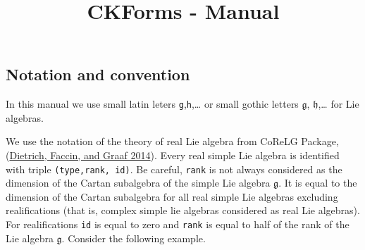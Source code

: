 \documentclass[
]{article}
\title{CKForms - Manual}
\author{}
\date{\vspace{-2.5em}}
\begin{document}
\maketitle

\hypertarget{notation-and-convention}{%
\subsection{Notation and convention}\label{notation-and-convention}}

In this manual we use small latin leters \texttt{g},\texttt{h},\ldots{}
or small gothic letters \(\mathfrak{g}\), \(\mathfrak{h}\),\ldots{} for
Lie algebras.

We use the notation of the theory of real Lie algebra from CoReLG
Package, (\protect\hyperlink{ref-CoReLG}{Dietrich, Faccin, and Graaf
2014}). Every real simple Lie algebra is identified with triple
\texttt{(type,rank,\ id)}. Be careful, \texttt{rank} is not always
considered as the dimension of the Cartan subalgebra of the simple Lie
algebra \(\mathfrak{g}\). It is equal to the dimension of the Cartan
subalgebra for all real simple Lie algebras excluding realifications
(that is, complex simple lie algebras considered as real Lie algebras).
For realifications \texttt{id} is equal to zero and \texttt{rank} is
equal to half of the rank of the Lie algebra \(\mathfrak{g}\). Consider
the following example.
\end{document}
